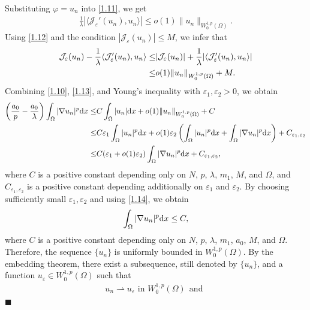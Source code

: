 \documentclass[onecolumn]{autart}
\newenvironment{proof}{{\it Proof: \enspace}}{\hfill $\blacksquare$\par}
\begin{document}
\begin{proof}
	Substituting $\varphi = u_n$ into \eqref{1.11}, we get
	\begin{align}\label{1.12}
		\frac{1}{\lambda} |\langle \mathcal{J}_\varepsilon'(u_n), u_n \rangle| \leq o(1) \|u_n\|_{W^{1,p}_{0}(\Omega)}.
	\end{align}
	Using \eqref{1.12} and the condition $|\mathcal{J}_\varepsilon(u_n)| \leq M$, we infer that
	\begin{align}
		\mathcal{J}_\varepsilon(u_n) -	\frac{1}{\lambda} \langle \mathcal{J}_\varepsilon'(u_n), u_n \rangle \leq&  |\mathcal{J}_\varepsilon(u_n)| + \frac{1}{\lambda}|\langle \mathcal{J}_\varepsilon'(u_n), u_n \rangle|
		\notag\\\leq
		& o(1) \|u_n\|_{W^{1,p}_{0}(\Omega)}+M. \label{1.13}
	\end{align}
	Combining \eqref{1.10}, \eqref{1.13}, and Young's inequality with $\varepsilon_1,\varepsilon_2>0$, we obtain
	\begin{align}
		\left( \frac{a_0}{p} - \frac{a_0}{\lambda} \right)\int_\Omega |\nabla u_n|^p \mathrm{d}x \leq&  C\int_\Omega |u_n| \mathrm{d}x +o(1) \|u_n\|_{W^{1,p}_{0}(\Omega)}+ C
		\notag\\ \leq
		&  C\varepsilon_1\int_\Omega |u_n|^p \mathrm{d}x +o(1)\varepsilon_2\left( \int_\Omega |u_n|^p\mathrm{d}x + \int_\Omega |\nabla u_n|^p\mathrm{d}x\right) + C_{\varepsilon_1 ,\varepsilon_2}
		\notag\\ \leq
		&  C(\varepsilon_1+o(1)\varepsilon_2)\int_\Omega |\nabla u_n|^p \mathrm{d}x + C_{\varepsilon_1 ,\varepsilon_2}, \label{1.14}
	\end{align}
	where     $C$ is a  positive constant depending only on $N$, $p$, $\lambda$, $m_1$, $M$, and $\Omega$, and $C_{\varepsilon_1 ,\varepsilon_2}$ is a  positive constant depending additionally on $\varepsilon_1$ and $\varepsilon_2$.
	By choosing sufficiently small $\varepsilon_1,\varepsilon_2$  and using \eqref{1.14}, we obtain
	\begin{align}
		\int_\Omega |\nabla u_n|^p \mathrm{d}x \leq C,\notag
	\end{align}
	where     $C$ is a  positive constant depending only on  $N$, $p$, $\lambda$, $m_1$, $a_0$, $M$,    and $\Omega$.
	Therefore, the sequence $\{u_n\}$ is uniformly bounded in $W^{1,p}_0(\Omega)$. By the embedding theorem, there exist a subsequence, still denoted by $\{u_n\}$, and a function $u_\varepsilon \in W^{1,p}_0(\Omega)$ such that
	\begin{align}\label{1.15}
		u_n \rightharpoonup u_\varepsilon \text{ in } W^{1,p}_0(\Omega) \ \ \text{and}\ \

\end{align}
\end{proof}
\end{document}
